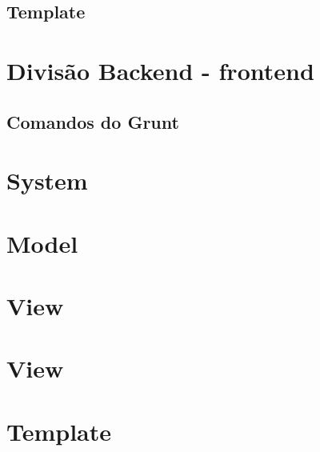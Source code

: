         \subsection{Template\label{sub:system-template}}





    \section{Divisão Backend - frontend\label{sec:back-front}}


        \subsection{Comandos do Grunt\label{sub:comandos-grunt}}

    \section{System\label{sec:estrutura-pastas}}

    \section{Model\label{sec:estrutura-pastas}}

    \section{View\label{sec:estrutura-pastas}}

    \section{View\label{sec:estrutura-pastas}}

    \section{Template\label{sec:estrutura-pastas}}
